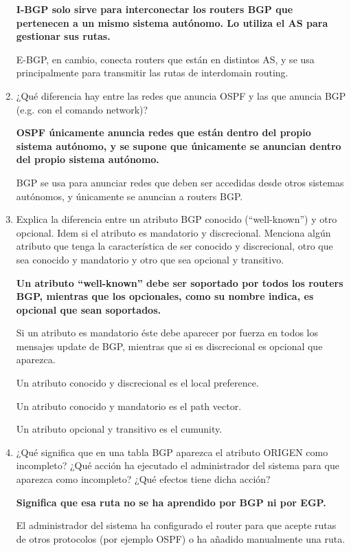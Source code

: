 \documentclass[a4paper]{article}
\begin{document}
\begin{enumerate}
        {\bfseries
            I-BGP solo sirve para interconectar los routers BGP que pertenecen a un mismo sistema autónomo. Lo utiliza el AS para gestionar sus rutas.

            E-BGP, en cambio, conecta routers que están en distintos AS, y se usa principalmente para transmitir las rutas de interdomain routing.
        }
        \item ¿Qué diferencia hay entre las redes que anuncia OSPF y las que anuncia BGP (e.g. con el
        comando network)?

        {\bfseries
            OSPF únicamente anuncia redes que están dentro del propio sistema autónomo, y se supone que únicamente se anuncian dentro del propio sistema autónomo.

            BGP se usa para anunciar redes que deben ser accedidas desde otros sistemas autónomos, y únicamente se anuncian a routers BGP.
        }

        \item Explica la diferencia entre un atributo BGP conocido (“well-known”) y otro opcional. Idem
        si el atributo es mandatorio y discrecional. Menciona algún atributo que tenga la característica de
        ser conocido y discrecional, otro que sea conocido y mandatorio y otro que sea opcional y
        transitivo.

        {\bfseries
            Un atributo ``well-known'' debe ser soportado por todos los routers BGP, mientras que los opcionales, como su nombre indica, es opcional que sean soportados.

            Si un atributo es mandatorio éste debe aparecer por fuerza en todos los mensajes update de BGP, mientras que si es discrecional es opcional que aparezca.

            Un atributo conocido y discrecional es el local preference.

            Un atributo conocido y mandatorio es el path vector.

            Un atributo opcional y transitivo es el cumunity.
        }
        \item ¿Qué significa que en una tabla BGP aparezca el atributo ORIGEN como incompleto? ¿Qué
        acción ha ejecutado el administrador del sistema para que aparezca como incompleto? ¿Qué
        efectos tiene dicha acción?

        {\bfseries
            Significa que esa ruta no se ha aprendido por BGP ni por EGP.

            El administrador del sistema ha configurado el router para que acepte rutas de otros protocolos (por ejemplo OSPF) o ha añadido manualmente una ruta.

}
\end{enumerate}
\end{document}
